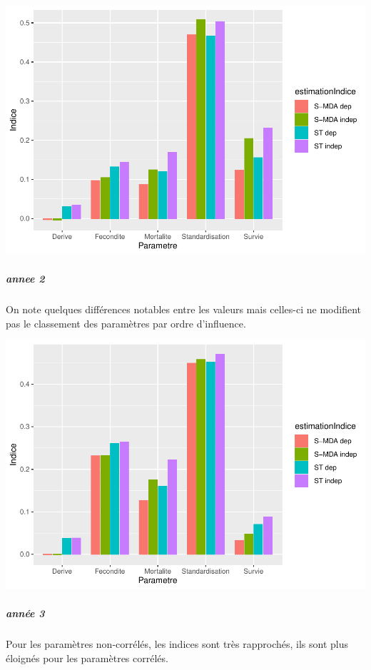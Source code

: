 \documentclass[
]{article}
\begin{document}
\includegraphics{rapport_files/figure-latex/pfrtygs-1.pdf}

\hypertarget{annee-2}{%
\subparagraph{annee 2}\label{annee-2}}

On note quelques différences notables entre les valeurs mais celles-ci
ne modifient pas le classement des paramètres par ordre d'influence.

\includegraphics{rapport_files/figure-latex/prtygsrd-1.pdf}

\hypertarget{annuxe9e-3}{%
\subparagraph{année 3}\label{annuxe9e-3}}

Pour les paramètres non-corrélés, les indices sont très rapprochés, ils
sont plus éloignés pour les paramètres corrélés.
\end{document}
